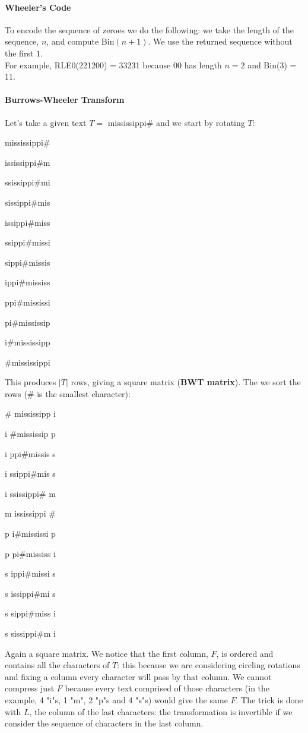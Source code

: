 \documentclass[10pt]{report}
\begin{document}
\paragraph{Wheeler's Code} To encode the sequence of zeroes we do the following: we take the length of the sequence, $n$, and compute Bin$(n+1)$. We use the returned sequence without the first $1$.\\
For example, RLE0(221200) = 33231 because 00 has length $n=2$ and Bin(3) = 11.
\paragraph{Burrows-Wheeler Transform} Let's take a given text $T=$ mississippi\# and we start by rotating $T$:
\begin{list}{}{}
	\item mississippi\#
	\item ississippi\#m
	\item ssissippi\#mi
	\item sissippi\#mis
	\item issippi\#miss
	\item ssippi\#missi
	\item sippi\#missis
	\item ippi\#mississ
	\item ppi\#mississi
	\item pi\#mississip
	\item i\#mississipp
	\item \#mississippi
\end{list}
This produces $|T|$ rows, giving a square matrix (\textbf{BWT matrix}). The we sort the rows (\# is the smallest character):
\begin{list}{}{}
	\item \# mississipp i
	\item i \#mississip p
	\item i ppi\#missis s
	\item i ssippi\#mis s
	\item i ssissippi\# m
	\item m ississippi \#
	\item p i\#mississi p
	\item p pi\#mississ i
	\item s ippi\#missi s
	\item s issippi\#mi s
	\item s sippi\#miss i
	\item s sissippi\#m i
\end{list}
Again a square matrix. We notice that the first column, $F$, is ordered and contains all the characters of $T$: this because we are considering circling rotations and fixing a column every character will pass by that column. We cannot compress just $F$ because every text comprised of those characters (in the example, 4 "i"s, 1 "m", 2 "p"s and 4 "s"s) would give the same $F$. The trick is done with $L$, the column of the last characters: the transformation is invertible if we consider the sequence of characters in the last column.\\
\end{document}
